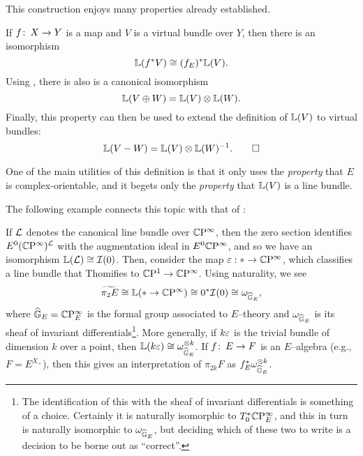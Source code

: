 This construction enjoys many properties already established.
\begin{corollary}
If $f \colon\thinspace X \to Y$ is a map and $V$ is a virtual bundle over $Y$, then there is an isomorphism \[\mathbb{L}(f^* V) \cong (f_E)^* \mathbb{L}(V).\]  Using , there is also is a canonical isomorphism \[\mathbb{L}(V \oplus W) = \mathbb{L}(V) \otimes \mathbb{L}(W).\]  Finally, this property can then be used to extend the definition of $\mathbb{L}(V)$ to virtual bundles: \[\mathbb{L}(V - W) = \mathbb{L}(V) \otimes \mathbb{L}(W)^{-1}. \qed\]
\end{corollary}

\begin{remark}
One of the main utilities of this definition is that it only uses the \emph{property} that $E$ is complex-orientable, and it begets only the \emph{property} that $\mathbb{L}(V)$ is a line bundle.
\end{remark}

The following example connects this topic with that of :
\begin{example}
If $\mathcal{L}$ denotes the canonical line bundle over $\mathbb{C}\mathrm P^\infty$, then the zero section identifies $E^0 (\mathbb{C}\mathrm P^\infty)^{\mathcal{L}}$ with the augmentation ideal in $E^0 \mathbb{C}\mathrm P^\infty$, and so we have an isomorphism $\mathbb{L}(\mathcal{L}) \cong \mathcal{I}(0)$.  Then, consider the map $\varepsilon: * \to \mathbb{C}\mathrm P^\infty$, which classifies a line bundle that Thomifies to $\mathbb{C}\mathrm P^1 \to \mathbb{C}\mathrm P^\infty$.  Using naturality, we see \[\widetilde{\pi_2 E} \cong \mathbb{L}(* \to \mathbb{C}\mathrm P^\infty) \cong 0^* \mathcal{I}(0) \cong \omega_{\widehat{\mathbb G}_E},\] where $\widehat{\mathbb G}_E = \mathbb{C}\mathrm P^\infty_E$ is the formal group associated to $E$--theory and $\omega_{\widehat{\mathbb G}_E}$ is its sheaf of invariant differentials\footnote{The identification of this with the sheaf of invariant differentials is something of a choice.  Certainly it is naturally isomorphic to $T_0^* \mathbb{C}\mathrm P^\infty_E$, and this in turn is naturally isomorphic to $\omega_{\widehat{\mathbb G}_E}$, but deciding which of these two to write is a decision to be borne out as ``correct''.}.  More generally, if $k \varepsilon$ is the trivial bundle of dimension $k$ over a point, then $\mathbb{L}(k \varepsilon) \cong \omega_{\widehat{\mathbb G}_E}^{\otimes k}$.  If $f \colon\thinspace E \to F$ is an $E$--algebra (e.g., $F = E^{X_+}$), then this gives an interpretation of $\pi_{2k} F$ as $f_E^* \omega_{\widehat{\mathbb G}_E}^{\otimes k}$.
\end{example}

